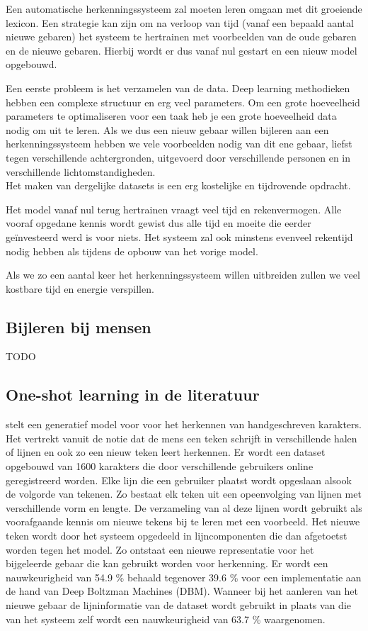 \npar Een automatische herkenningssysteem zal moeten leren omgaan met dit groeiende lexicon. Een strategie kan zijn om na verloop van tijd (vanaf een bepaald aantal nieuwe gebaren) het systeem te hertrainen met voorbeelden van de oude gebaren en de nieuwe gebaren. Hierbij wordt er dus vanaf nul gestart en een nieuw model opgebouwd.

\npar Een eerste probleem is het verzamelen van de data. Deep learning methodieken hebben een complexe structuur en erg veel parameters. Om een grote hoeveelheid parameters te optimaliseren voor een taak heb je een grote hoeveelheid data nodig om uit te leren. Als we dus een nieuw gebaar willen bijleren aan een herkenningssysteem hebben we vele voorbeelden nodig van dit ene gebaar, liefst tegen verschillende achtergronden, uitgevoerd door verschillende personen en in verschillende lichtomstandigheden.
\\ Het maken van dergelijke datasets is een erg kostelijke en tijdrovende opdracht.

\npar Het model vanaf nul terug hertrainen vraagt veel tijd en rekenvermogen. Alle vooraf opgedane kennis wordt gewist dus alle tijd en moeite die eerder ge\"investeerd werd is voor niets. Het systeem zal ook minstens evenveel rekentijd nodig hebben als tijdens de opbouw van het vorige model.

\npar Als we zo een aantal keer het herkenningssysteem willen uitbreiden zullen we veel kostbare tijd en energie verspillen.

\subsection{Bijleren bij mensen}
TODO

\subsection{One-shot learning in de literatuur}
\npar \cite{oneshot-vis-concepts} stelt een generatief model voor voor het herkennen van handgeschreven karakters. Het vertrekt vanuit de notie dat de mens een teken schrijft in verschillende halen of lijnen en ook zo een nieuw teken leert herkennen. Er wordt een dataset opgebouwd van 1600 karakters die door verschillende gebruikers online geregistreerd worden. Elke lijn die een gebruiker plaatst wordt opgeslaan alsook de volgorde van tekenen. Zo bestaat elk teken uit een opeenvolging van lijnen met verschillende vorm en lengte. De verzameling van al deze lijnen wordt gebruikt als voorafgaande kennis om nieuwe tekens bij te leren met een voorbeeld. Het nieuwe teken wordt door het systeem opgedeeld in lijncomponenten die dan afgetoetst worden tegen het model. Zo ontstaat een nieuwe representatie voor het bijgeleerde gebaar die kan gebruikt worden voor herkenning. Er wordt een nauwkeurigheid van 54.9 \% behaald tegenover 39.6 \% voor een implementatie aan de hand van Deep Boltzman Machines (DBM). Wanneer bij het aanleren van het nieuwe gebaar de lijninformatie van de dataset wordt gebruikt in plaats van die van het systeem zelf wordt een nauwkeurigheid van 63.7 \% waargenomen.

